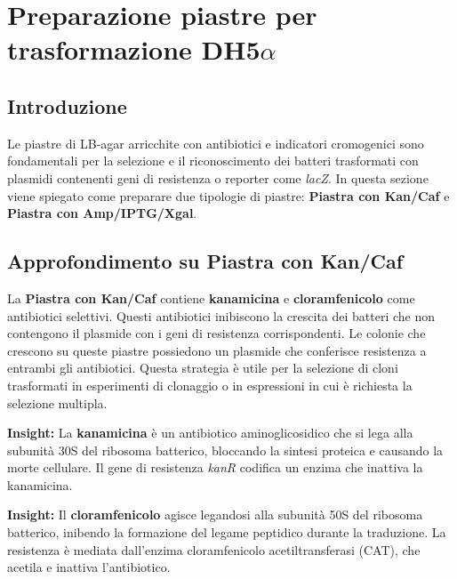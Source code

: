\section {Preparazione piastre per trasformazione DH5$\alpha$}

\subsection{Introduzione}
Le piastre di LB-agar arricchite con antibiotici e indicatori cromogenici sono fondamentali per la selezione e il riconoscimento dei batteri trasformati con plasmidi contenenti geni di resistenza o reporter come \textit{lacZ}. In questa sezione viene spiegato come preparare due tipologie di piastre: \textbf{Piastra con Kan/Caf} e \textbf{Piastra con Amp/IPTG/Xgal}.

\subsection{Approfondimento su Piastra con Kan/Caf}
La \textbf{Piastra con Kan/Caf} contiene \textbf{kanamicina} e \textbf{cloramfenicolo} come antibiotici selettivi. Questi antibiotici inibiscono la crescita dei batteri che non contengono il plasmide con i geni di resistenza corrispondenti. Le colonie che crescono su queste piastre possiedono un plasmide che conferisce resistenza a entrambi gli antibiotici. Questa strategia è utile per la selezione di cloni trasformati in esperimenti di clonaggio o in espressioni in cui è richiesta la selezione multipla.


\begin{insightBox}
  \textbf{Insight:} La \textbf{kanamicina} è un antibiotico aminoglicosidico che si lega alla subunità 30S del ribosoma batterico, bloccando la sintesi proteica e causando la morte cellulare. Il gene di resistenza \textit{kanR} codifica un enzima che inattiva la kanamicina.
\end{insightBox}

\begin{insightBox}
  \textbf{Insight:} Il \textbf{cloramfenicolo} agisce legandosi alla subunità 50S del ribosoma batterico, inibendo la formazione del legame peptidico durante la traduzione. La resistenza è mediata dall’enzima cloramfenicolo acetiltransferasi (CAT), che acetila e inattiva l’antibiotico.
\end{insightBox}

